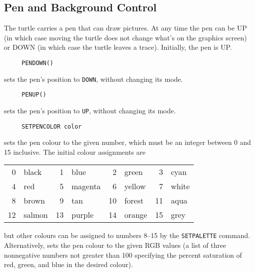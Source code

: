 \subsection{Pen and Background Control}
\label{logoturtle:PBC}

The turtle carries a pen that can draw pictures.  At any time the pen
can be UP (in which case moving the turtle does not change what's on the
graphics screen) or DOWN (in which case the turtle leaves a trace).
Initially, the pen is UP.

\begin{verbatim}
     PENDOWN()
\end{verbatim}
sets the pen's position to \texttt{DOWN}, without changing its mode.

\begin{verbatim}
     PENUP()
\end{verbatim}
sets the pen's position to \texttt{UP}, without changing its mode.




\begin{verbatim}
     SETPENCOLOR color
\end{verbatim}
\label{logoturtle:setpencolor}
sets the pen colour to the given number, which must be an integer
between 0 and 15 inclusive.  The initial colour assignments are
\begin{center}
  \begin{tabular}{rlrlrlrl}
    0 & black  &  1 & blue    &  2 & green  &  3 & cyan  \\
    4 & red    &  5 & magenta &  6 & yellow &  7 & white \\
    8 & brown  &  9 & tan     & 10 & forest & 11 & aqua  \\
    12 & salmon & 13 & purple  & 14 & orange & 15 & grey
  \end{tabular}
\end{center}
but other colours can be assigned to numbers 8--15 by the
\texttt{SETPALETTE} command.  Alternatively, sets the pen colour to
the given RGB values (a list of three nonnegative numbers not greater
than 100 specifying the percent saturation of red, green, and blue in
the desired colour).

